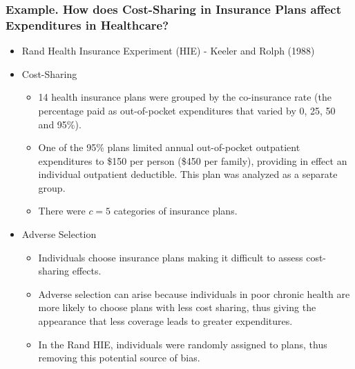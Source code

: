 \begin{frame}[shrink=5]
 \frametitle{Example. How does Cost-Sharing in Insurance Plans affect
Expenditures in Healthcare?} %
  \begin{itemize}
   \item Rand Health Insurance Experiment (HIE) - Keeler and Rolph (1988)
\item Cost-Sharing
 \begin{itemize}
\item 14 health insurance plans were grouped by the co-insurance rate (the
percentage paid as out-of-pocket expenditures that varied by 0, 25,
50 and 95\%).
\item One of the 95\% plans limited annual out-of-pocket outpatient
expenditures to \$150 per person (\$450 per family), providing in
effect an individual outpatient deductible. This plan was analyzed
as a separate group.
 \item There were $c=5$ categories of insurance
plans.
 \end{itemize}
 \item Adverse Selection
 \begin{itemize}
\item Individuals choose insurance plans making it difficult to assess
cost-sharing effects.
\item Adverse selection
can arise because individuals in poor chronic health are more likely
to choose plans with less cost sharing, thus giving the appearance
that less coverage leads to greater expenditures.
\item In the Rand HIE,
individuals were randomly assigned to plans, thus removing this
potential source of bias.
 \end{itemize}
     \end{itemize}
\end{frame}

